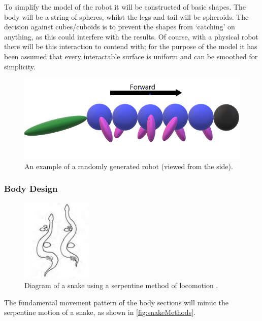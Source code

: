 \documentclass{article}
\begin{document}
To simplify the model of the robot it will be constructed of basic shapes. The body will be a string of spheres, whilst the legs and tail will be spheroids. The decision against cubes/cuboids is to prevent the shapes from ‘catching’ on anything, as this could interfere with the results. Of course, with a physical robot there will be this interaction to contend with; for the purpose of the model it has been assumed that every interactable surface is uniform and can be smoothed for simplicity. \\

\begin{figure}[H]
\centering
\includegraphics[scale=0.5]{robotDesign}
\caption{An example of a randomly generated robot (viewed from the side).}
\end{figure}

\newpage
\subsubsection{Body Design}
\label{sec:Body Movement}
\begin{figure}
    \centering
    \vspace*{-5mm}
    \includegraphics[width=0.3\textwidth]{serpentine}
    \vspace*{-7mm}
\caption{Diagram of a snake using a serpentine method of locomotion \citep{reptileLocomotion}.}
    \label{fig:snakeMethods}
\end{figure}
The fundamental movement pattern of the body sections will mimic the serpentine motion of a snake, as shown in \autoref{fig:snakeMethods}.\\
\end{document}

